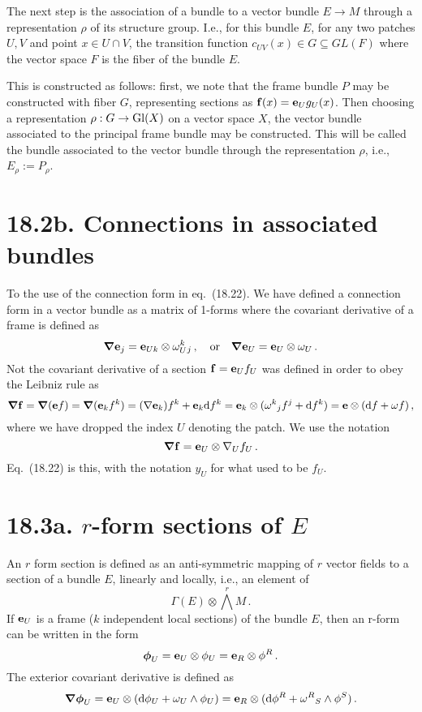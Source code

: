 \documentclass[a4paper,12pt]{article}
\def\d{\mathrm{d}}
\begin{document}
The next step is the association of a bundle to a vector bundle $E\to M$ through a representation $\rho$ of its structure group. I.e., for this bundle $E$, for any two patches $U, V$ and point $x\in U\cap V$, the transition function $c_{UV}(x) \in G \subseteq GL(F)$ where the vector space $F$ is the fiber of the bundle $E$.

This is constructed as follows: first, we note that the frame bundle $P$ may be constructed with fiber $G$, representing sections as ${\bf f}(x) = {\bf e}_U g_U(x)$. Then choosing a representation $\rho: G \to {\rm Gl}(X)$ on a vector space $X$, the vector bundle associated to the principal frame bundle may be constructed. This will be called the bundle associated to the vector bundle through the representation $\rho$, i.e., $E_\rho := P_\rho$.



\section*{18.2b. Connections in associated bundles}

To the use of the connection form in eq.\ (18.22). We have defined a connection form in a vector bundle as a matrix of 1-forms where the covariant derivative of a frame is defined as
\[
 \boldsymbol\nabla {\bf e}_j = {\bf e}_{Uk} \otimes \omega_U^k{}_j\,,\quad\text{or}\quad \boldsymbol\nabla {\bf e}_U = {\bf e}_U\otimes \omega_U\,.
\]
Not the covariant derivative of a section ${\bf f}={\bf e}_U f_U$ was defined in order to obey the Leibniz rule as
\[
 \boldsymbol\nabla {\bf f} = \boldsymbol\nabla({\bf e}f) = \boldsymbol\nabla({\bf e}_k f^k) = (\nabla {\bf e}_k)f^k + {\bf e}_k \d f^k = {\bf e}_k \otimes (\omega^k{}_jf^j + \d f^k) = {\bf e}\otimes (\d f + \omega f)\,,
\]
where we have dropped the index $U$ denoting the patch. We use the notation
\[
 \boldsymbol\nabla{\bf f} = {\bf e}_U \otimes \nabla_U f_U\,.
\]
Eq.\ (18.22) is this, with the notation $y_U$ for what used to be $f_U$.


\section*{18.3a. $r$-form sections of $E$}

An $r$ form section is defined as an anti-symmetric mapping of $r$ vector fields to a section of a bundle $E$, linearly and locally, i.e., an element of
\[
 \Gamma(E) \otimes \bigwedge^r M\,.
\]
If ${\bf e}_U$ is a frame ($k$ independent local sections) of the bundle $E$, then an r-form can be written in the form
\[
 \boldsymbol\phi_U = {\bf e}_U \otimes \phi_U = {\bf e}_R \otimes \phi^R\,.
\]
The exterior covariant derivative is defined as
\[
 \boldsymbol\nabla\boldsymbol\phi_U = {\bf e}_U \otimes (\d \phi_U + \omega_U \wedge \phi_U) = {\bf e}_R \otimes(\d\phi^R + \omega^R{}_S \wedge \phi^S)\,.
\]
\end{document}
